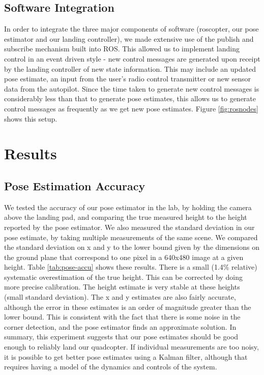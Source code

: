 \documentclass[10pt]{scrartcl} %
\begin{document}
\subsection{Software Integration}
In order to integrate the three major components of software (roscopter, our pose estimator and our landing controller), we made extensive use of the publish and subscribe mechanism built into ROS. This allowed us to implement landing control in an event driven style - new control messages are generated upon receipt by the landing controller of new state information. This may include an updated pose estimate, an input from the user's radio control transmitter or new sensor data from the autopilot. Since the time taken to generate new control messages is considerably less than that to generate pose estimates, this allows us to generate control messages as frequently as we get new pose estimates. Figure \ref{fig:rosnodes} shows this setup.

\section{Results}

\subsection{Pose Estimation Accuracy}
\label{sec:accuracy}

We tested the accuracy of our pose estimator in the lab, by holding the camera
above the landing pad, and comparing the true measured height to the height
reported by the pose estimator. We also measured the standard deviation in our
pose estimate, by taking multiple measurements of the same scene. We compared
the standard deviation on x and y to the lower bound given by the dimensions on
the ground plane that correspond to one pixel in a 640x480 image at a given
height. Table \ref{tab:pose-accu} shows these results. There is a small (1.4\%
relative) systematic overestimation of the true height. This can be corrected
by doing more precise calibration. The height estimate is very stable at these
heights (small standard deviation). The x and y estimates are also fairly
accurate, although the error in these estimates is an order of magnitude
greater than the lower bound. This is consistent with the fact that there is
some noise in the corner detection, and the pose estimator finds an approximate
solution. In summary, this experiment suggests that our pose estimates should
be good enough to reliably land our quadcopter. If individual measurements are
too noisy, it is possible to get better pose estimates using a Kalman filter,
although that requires having a model of the dynamics and controls of the
system.
\end{document}
